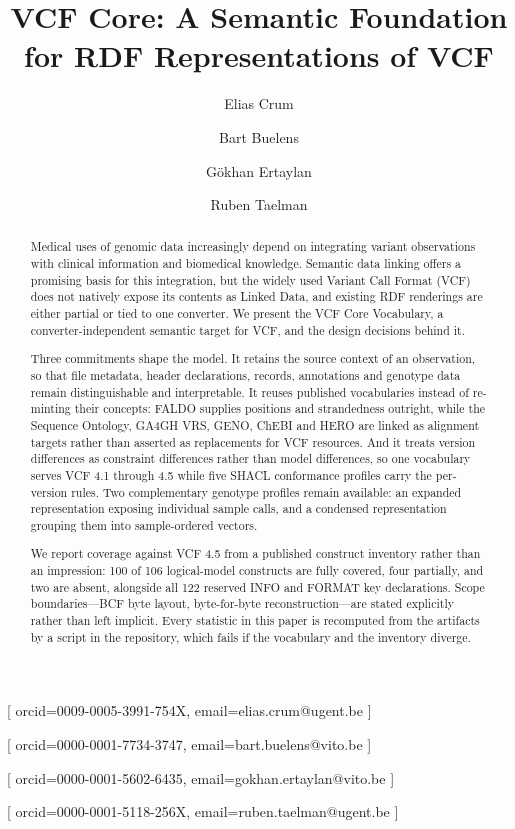 \documentclass{ceurart}
\begin{document}

\title{VCF Core: A Semantic Foundation for RDF Representations of VCF}

\author[1,2]{Elias Crum}[
orcid=0009-0005-3991-754X,
email=elias.crum@ugent.be
]
\cormark[1]
\author[2]{Bart Buelens}[
orcid=0000-0001-7734-3747,
email=bart.buelens@vito.be
]
\author[2]{Gökhan Ertaylan}[
orcid=0000-0001-5602-6435,
email=gokhan.ertaylan@vito.be
]
\author[1]{Ruben Taelman}[
orcid=0000-0001-5118-256X,
email=ruben.taelman@ugent.be
]
\address[1]{IDLab, Department of Electronics and Information Systems, Ghent University -- imec, Belgium}
\address[2]{Flemish institute for Technological Research (VITO) Mol, Belgium}


\begin{abstract}
Medical uses of genomic data increasingly depend on integrating variant observations with clinical information and biomedical knowledge.
Semantic data linking offers a promising basis for this integration, but the widely used Variant Call Format (VCF) does not natively expose its contents as Linked Data, and existing RDF renderings are either partial or tied to one converter.
We present the VCF Core Vocabulary, a converter-independent semantic target for VCF, and the design decisions behind it.

Three commitments shape the model.
It retains the source context of an observation, so that file metadata, header declarations, records, annotations and genotype data remain distinguishable and interpretable.
It reuses published vocabularies instead of re-minting their concepts: FALDO supplies positions and strandedness outright, while the Sequence Ontology, GA4GH VRS, GENO, ChEBI and HERO are linked as alignment targets rather than asserted as replacements for VCF resources.
And it treats version differences as constraint differences rather than model differences, so one vocabulary serves VCF 4.1 through 4.5 while five SHACL conformance profiles carry the per-version rules.
Two complementary genotype profiles remain available: an expanded representation exposing individual sample calls, and a condensed representation grouping them into sample-ordered vectors.

We report coverage against VCF 4.5 from a published construct inventory rather than an impression: 100 of 106 logical-model constructs are fully covered, four partially, and two are absent, alongside all 122 reserved INFO and FORMAT key declarations.
Scope boundaries---BCF byte layout, byte-for-byte reconstruction---are stated explicitly rather than left implicit.
Every statistic in this paper is recomputed from the artifacts by a script in the repository, which fails if the vocabulary and the inventory diverge.
\end{abstract}
\end{document}
